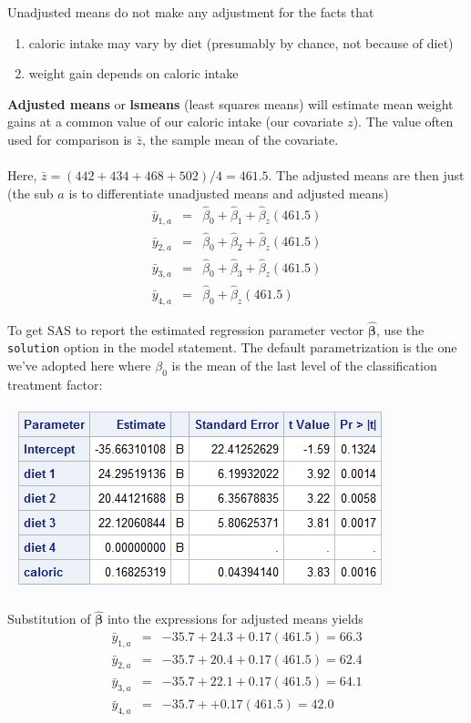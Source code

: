 Unadjusted means do not make any adjustment for the facts that 
\begin{enumerate}
\item caloric intake may vary by diet (presumably by chance, not because of diet)
\item weight gain depends on caloric intake
\end{enumerate}

\newpage

\textbf{Adjusted means} or \textbf{lsmeans} (least squares means) will estimate mean weight gains at a common value of our caloric intake (our covariate $z$).  The value often used for comparison is $\bar{z}$, the sample mean of the covariate.\\~\\

Here, $\bar{z}= (442+434+468+502)/4 = 461.5$.  The adjusted means are then just (the sub $a$ is to differentiate unadjusted means and adjusted means)
\begin{eqnarray*}
\bar{y}_{1,a} & = & \hat\beta_0 + \hat\beta_1 + \hat\beta_z (461.5) \\
\bar{y}_{2,a} & = & \hat\beta_0 + \hat\beta_2 + \hat\beta_z (461.5) \\
\bar{y}_{3,a} & = & \hat\beta_0 + \hat\beta_3 + \hat\beta_z (461.5) \\
\bar{y}_{4,a} & = & \hat\beta_0 + \hat\beta_z (461.5)
\end{eqnarray*} 

To get SAS to report the estimated regression parameter vector $\hat{\boldsymbol{\beta}}$, use the {\tt solution} option in the model statement.  The default parametrization is the one we've adopted here where $\beta_0$ is the mean of the last level of the classification treatment factor:

\begin{center}
\includegraphics{DietsEstimates}
\end{center}

Substitution of $\hat{\boldsymbol{\beta}}$ into the expressions for adjusted means yields
\begin{eqnarray*}
\bar{y}_{1,a} & = & -35.7 + 24.3 + 0.17 (461.5) = 66.3\\
\bar{y}_{2,a} & = & -35.7 + 20.4 + 0.17 (461.5) = 62.4 \\
\bar{y}_{3,a} & = & -35.7 + 22.1 + 0.17 (461.5) = 64.1 \\
\bar{y}_{4,a} & = & -35.7 + + 0.17 (461.5) = 42.0 
\end{eqnarray*} 

